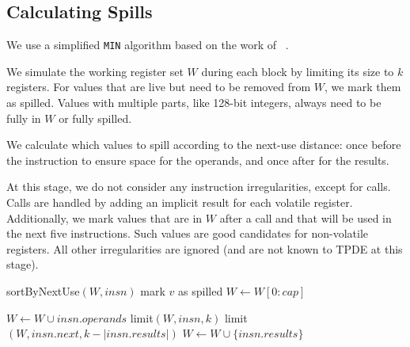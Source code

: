 \subsection{Calculating Spills}
\label{sec:spill_calculation}

We use a simplified \texttt{MIN} algorithm based on the work of \citeauthor{hack-spilling}~\cite{hack-spilling}. 

We simulate the working register set $W$ during each block by limiting its size to $k$ registers. For values that are live but need to be removed from $W$, we mark them as spilled.
Values with multiple parts, like 128-bit integers, always need to be fully in $W$ or fully spilled.

We calculate which values to spill according to the next-use distance: once before the instruction to ensure space for the operands, and once after for the results.

At this stage, we do not consider any instruction irregularities, except for calls. Calls are handled by adding an implicit result for each volatile register. Additionally, we mark values that are in $W$ after a call and that will be used in the next five instructions. Such values are good candidates for non-volatile registers.
All other irregularities are ignored (and are not known to TPDE at this stage).


\begin{algorithm}
\caption{The MIN algorithm}
\centering
\begin{minipage}[t]{0.4\linewidth}
\begin{algorithmic}[0]
    \State sortByNextUse$(W, \textit{insn})$
            \State mark $v$ as spilled
        \EndIf
    \EndFor
    \State $W \gets W[0\!:\!cap]$
\EndFunction
\end{algorithmic}
\end{minipage}
\hfill
\begin{minipage}[t]{0.57\linewidth}
\begin{algorithmic}[0]
        \State $W \gets W \cup \textit{insn.operands}$
        \State limit$(W, \textit{insn}, k)$
        \State limit$(W, \textit{insn.next}, k - |\textit{insn.results}|)$
        \State $W \gets W \cup \{\textit{insn.results}\}$
    \EndFor
\EndFunction
\end{algorithmic}
\end{minipage}

\caption{Simplified \texttt{MIN} algorithm for a single basic block~\cite{hack-spilling}. }

\end{algorithm}

